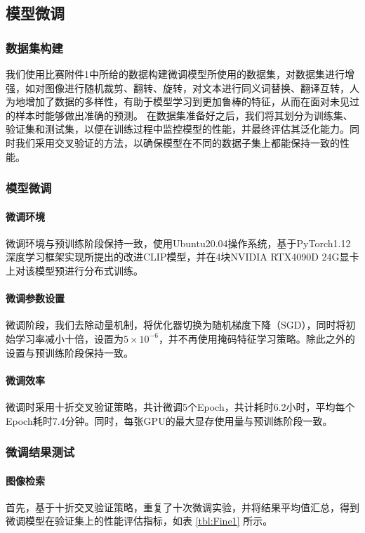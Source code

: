 \documentclass[a4paper]{zreport}
\begin{document}
\subsection{模型微调}

\subsubsection{数据集构建}
我们使用比赛附件1中所给的数据构建微调模型所使用的数据集，对数据集进行增强，如对图像进行随机裁剪、翻转、旋转，对文本进行同义词替换、翻译互转，人为地增加了数据的多样性，有助于模型学习到更加鲁棒的特征，从而在面对未见过的样本时能够做出准确的预测。
在数据集准备好之后，我们将其划分为训练集、验证集和测试集，以便在训练过程中监控模型的性能，并最终评估其泛化能力。同时我们采用交叉验证的方法，以确保模型在不同的数据子集上都能保持一致的性能。
\subsubsection{模型微调}

\paragraph{微调环境}微调环境与预训练阶段保持一致，使用Ubuntu20.04操作系统，基于PyTorch1.12深度学习框架实现所提出的改进CLIP模型，并在4块NVIDIA RTX4090D 24G显卡上对该模型预进行分布式训练。

\paragraph{微调参数设置}微调阶段，我们去除动量机制，将优化器切换为随机梯度下降（SGD），同时将初始学习率减小十倍，设置为$5 \times 10^{-6}$，并不再使用掩码特征学习策略。除此之外的设置与预训练阶段保持一致。

\paragraph{微调效率}微调时采用十折交叉验证策略，共计微调5个Epoch，共计耗时6.2小时，平均每个Epoch耗时7.4分钟。同时，每张GPU的最大显存使用量与预训练阶段一致。


\subsubsection{微调结果测试}

\paragraph{图像检索}首先，基于十折交叉验证策略，重复了十次微调实验，并将结果平均值汇总，得到微调模型在验证集上的性能评估指标，如表 \ref{tbl:Fine1} 所示。
\end{document}

